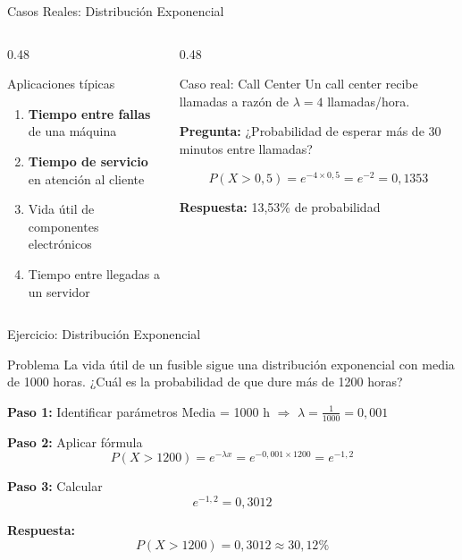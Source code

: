 \documentclass[10pt]{beamer}
\begin{document}
\begin{frame}{Casos Reales: Distribución Exponencial}
\begin{columns}[T]
\begin{column}{0.48\textwidth}
\begin{block}{Aplicaciones típicas}
\begin{enumerate}
  \item \textbf{Tiempo entre fallas} de una máquina
  \item \textbf{Tiempo de servicio} en atención al cliente
  \item Vida útil de componentes electrónicos
  \item Tiempo entre llegadas a un servidor
\end{enumerate}
\end{block}
\end{column}
\begin{column}{0.48\textwidth}
\begin{exampleblock}{Caso real: Call Center}
\footnotesize
Un call center recibe llamadas a razón de $\lambda = 4$ llamadas/hora.

\textbf{Pregunta:} ¿Probabilidad de esperar más de 30 minutos entre llamadas?

$$P(X > 0{,}5) = e^{-4 \times 0{,}5} = e^{-2} = 0{,}1353$$

\textbf{Respuesta:} 13{,}53\% de probabilidad
\end{exampleblock}
\end{column}
\end{columns}
\end{frame}

\begin{frame}{Ejercicio: Distribución Exponencial}
\begin{exampleblock}{Problema}
La vida útil de un fusible sigue una distribución exponencial con media de 1000 horas. ¿Cuál es la probabilidad de que dure más de 1200 horas?
\end{exampleblock}

\vspace{0.2cm}
\begin{block}{\textbf{Paso 1:} Identificar parámetros}
Media = 1000 h $\Rightarrow$ $\lambda = \frac{1}{1000} = 0{,}001$
\end{block}

\begin{block}{\textbf{Paso 2:} Aplicar fórmula}
$$P(X > 1200) = e^{-\lambda x} = e^{-0{,}001 \times 1200} = e^{-1{,}2}$$
\end{block}

\begin{block}{\textbf{Paso 3:} Calcular}
$$e^{-1{,}2} = 0{,}3012$$
\end{block}

\begin{exampleblock}{\textbf{Respuesta:}}
$$\boxed{P(X > 1200) = 0{,}3012 \approx 30{,}12\%}$$
\end{exampleblock}
\end{frame}
\end{document}
